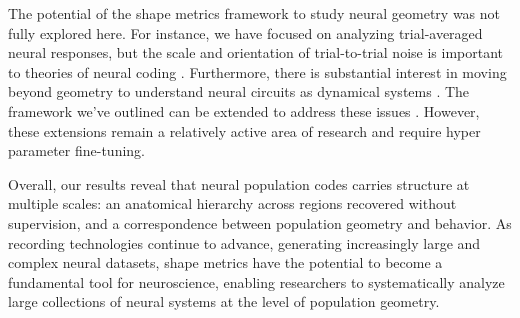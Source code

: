 The potential of the shape metrics framework to study neural geometry was not fully explored here. For instance, we have focused on analyzing trial-averaged neural responses, but the scale and orientation of trial-to-trial noise is important to theories of neural coding \parencite{moreno2014information}.
Furthermore, there is substantial interest in moving beyond geometry to understand neural circuits as dynamical systems \parencite{vyas2020computation}.
The framework we've outlined can be extended to address these issues \parencite{duong2023representational,ostrow2024beyond,nejatbakhsh2024comparing, cayco2026}.
However, these extensions remain a relatively active area of research and require hyper parameter fine-tuning.

Overall, our results reveal that neural population codes carries structure at multiple scales: an anatomical hierarchy across regions recovered without supervision, and a correspondence between population geometry and behavior.
As recording technologies continue to advance, generating increasingly large and complex neural datasets, shape metrics have the potential to become a fundamental tool for neuroscience, enabling researchers to systematically analyze large collections of neural systems at the level of population geometry.